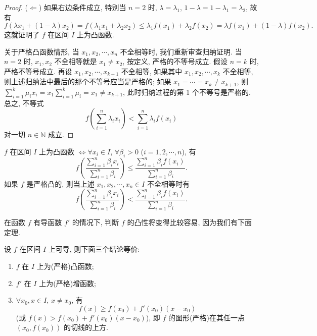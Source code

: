 \begin{proof}
($\Longleftarrow$) 如果右边条件成立, 特别当 $n=2$ 时, $\lambda=\lambda_{1}$, $1-\lambda=1-\lambda_{1}=\lambda_{2}$, 故有
\[
f(\lambda x_{1}+(1-\lambda)x_{2})=f(\lambda_{1}x_{1}+\lambda_{2}x_{2})\leqslant \lambda_{1}f(x_{1})+\lambda_{2}f(x_{2})=\lambda f(x_{1})+(1-\lambda)f(x_{2}).
\]
这就证明了 $f$ 在区间 $I$ 上为凸函数.

关于严格凸函数情形, 当 $x_{1},x_{2},\cdots,x_{n}$ 不全相等时, 我们重新审查归纳证明. 当 $n=2$ 时, $x_{1},x_{2}$ 不全相等就是 $x_{1}\neq x_{2}$, 按定义, 严格的不等号成立. 假设 $n=k$ 时, 严格不等号成立. 再设 $x_{1},x_{2},\cdots,x_{k+1}$ 不全相等, 如果其中 $x_{1},x_{2},\cdots,x_{k}$ 不全相等, 则上述归纳法中最后的那个不等号应当是严格的; 如果 $x_{1}=\cdots=x_{k}\neq x_{k+1}$, 则 $\sum_{i=1}^{k}\mu_{i}x_{i}=x_{1}\sum_{i=1}^{k}\mu_{i}=x_{1}\neq x_{k+1}$, 此时归纳过程的第 1 个不等号是严格的. 总之, 不等式
\[
f\left(\sum_{i=1}^{n}\lambda_{i}x_{i}\right)<\sum_{i=1}^{n}\lambda_{i}f(x_{i})
\]
对一切 $n\in\mathbb{N}$ 成立.
\end{proof}

\begin{theoremp}\label{thm:3.6.2p}
$f$ 在区间 $I$ 上为凸函数 $\Longleftrightarrow \forall x_{i}\in I$, $\forall \beta_{i}>0$ ($i=1,2,\cdots,n$), 有
\[
f\left(\frac{\displaystyle\sum_{i=1}^{n}\beta_{i}x_{i}}{\displaystyle\sum_{i=1}^{n}\beta_{i}}\right)\leqslant\frac{\displaystyle\sum_{i=1}^{n}\beta_{i}f(x_{i})}{\displaystyle\sum_{i=1}^{n}\beta_{i}}.
\]
如果 $f$ 是严格凸的, 则当上述 $x_{1},x_{2},\cdots,x_{n}\in I$ 不全相等时有
\[
f\left(\frac{\displaystyle\sum_{i=1}^{n}\beta_{i}x_{i}}{\displaystyle\sum_{i=1}^{n}\beta_{i}}\right)<\frac{\displaystyle\sum_{i=1}^{n}\beta_{i}f(x_{i})}{\displaystyle\sum_{i=1}^{n}\beta_{i}}.
\]
\end{theoremp}

在函数 $f$ 有导函数 $f'$ 的情况下, 判断 $f$ 的凸性将变得比较容易, 因为我们有下面定理.

\begin{theorem}\label{thm:3.6.3}
设 $f$ 在区间 $I$ 上可导, 则下面三个结论等价:
\begin{enumerate}[label=(\arabic*)]
  \item $f$ 在 $I$ 上为(严格)凸函数;
  \item $f'$ 在 $I$ 上为(严格)增函数;
  \item $\forall x_{0},x\in I$, $x\neq x_{0}$, 有
  \[
  f(x)\geqslant f(x_{0})+f'(x_{0})(x-x_{0})
\]
  (或 $f(x)>f(x_{0})+f'(x_{0})(x-x_{0})$), 即 $f$ 的图形(严格)在其任一点 $(x_{0},f(x_{0}))$ 的切线的上方.
\end{enumerate}
\end{theorem}

